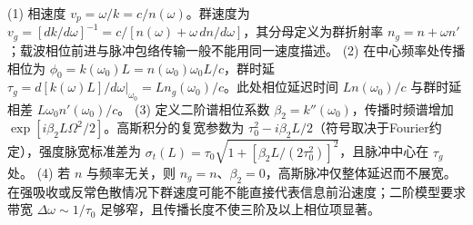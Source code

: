 (1) 相速度 \(v_p=\omega/k=c/n(\omega)\)。群速度为 \(v_g=[dk/d\omega]^{-1}=c/[n(\omega)+\omega\,dn/d\omega]\)，其分母定义为群折射率 \(n_g=n+\omega n'\)；载波相位前进与脉冲包络传输一般不能用同一速度描述。
(2) 在中心频率处传播相位为 \(\phi_0=k(\omega_0)L=n(\omega_0)\omega_0L/c\)，群时延 \(\tau_g=d[k(\omega)L]/d\omega|_{\omega_0}=Ln_g(\omega_0)/c\)。此处相位延迟时间 \(Ln(\omega_0)/c\) 与群时延相差 \(L\omega_0n'(\omega_0)/c\)。
(3) 定义二阶谱相位系数 \(\beta_2=k''(\omega_0)\)，传播时频谱增加 \(\exp[i\beta_2 L\Omega^2/2]\)。高斯积分的复宽参数为 \(\tau_0^2-i\beta_2L/2\)（符号取决于Fourier约定），强度脉宽标准差为 \(\sigma_t(L)=\tau_0\sqrt{1+[\beta_2L/(2\tau_0^2)]^2}\)，且脉冲中心在 \(\tau_g\) 处。
(4) 若 \(n\) 与频率无关，则 \(n_g=n\)、\(\beta_2=0\)，高斯脉冲仅整体延迟而不展宽。在强吸收或反常色散情况下群速度可能不能直接代表信息前沿速度；二阶模型要求带宽 \(\Delta\omega\sim1/\tau_0\) 足够窄，且传播长度不使三阶及以上相位项显著。
